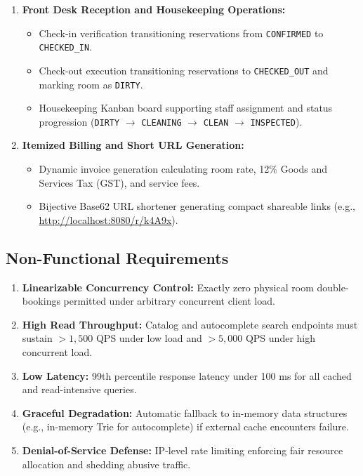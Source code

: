 \documentclass[11pt,a4paper]{article}
\begin{document}
\begin{enumerate}
    \begin{itemize}
        \item Atomic booking execution with distributed Redis lock protection to eliminate double-booking race conditions.
        \item Idempotency key tracking to prevent duplicate booking creation upon network retries.
        \item Global 64-bit unique booking identifier generation.
    \end{itemize}
    \item \textbf{Front Desk Reception and Housekeeping Operations:}
    \begin{itemize}
        \item Check-in verification transitioning reservations from \texttt{CONFIRMED} to \texttt{CHECKED\_IN}.
        \item Check-out execution transitioning reservations to \texttt{CHECKED\_OUT} and marking room as \texttt{DIRTY}.
        \item Housekeeping Kanban board supporting staff assignment and status progression (\texttt{DIRTY} $\to$ \texttt{CLEANING} $\to$ \texttt{CLEAN} $\to$ \texttt{INSPECTED}).
    \end{itemize}
    \item \textbf{Itemized Billing and Short URL Generation:}
    \begin{itemize}
        \item Dynamic invoice generation calculating room rate, 12\% Goods and Services Tax (GST), and service fees.
        \item Bijective Base62 URL shortener generating compact shareable links (e.g., \url{http://localhost:8080/r/k4A9x}).
    \end{itemize}
\end{enumerate}

\subsection{Non-Functional Requirements}
\begin{enumerate}
    \item \textbf{Linearizable Concurrency Control:} Exactly zero physical room double-bookings permitted under arbitrary concurrent client load.
    \item \textbf{High Read Throughput:} Catalog and autocomplete search endpoints must sustain $>1,500$ QPS under low load and $>5,000$ QPS under high concurrent load.
    \item \textbf{Low Latency:} 99th percentile response latency under 100 ms for all cached and read-intensive queries.
    \item \textbf{Graceful Degradation:} Automatic fallback to in-memory data structures (e.g., in-memory Trie for autocomplete) if external cache encounters failure.
    \item \textbf{Denial-of-Service Defense:} IP-level rate limiting enforcing fair resource allocation and shedding abusive traffic.
\end{enumerate}
\end{document}
